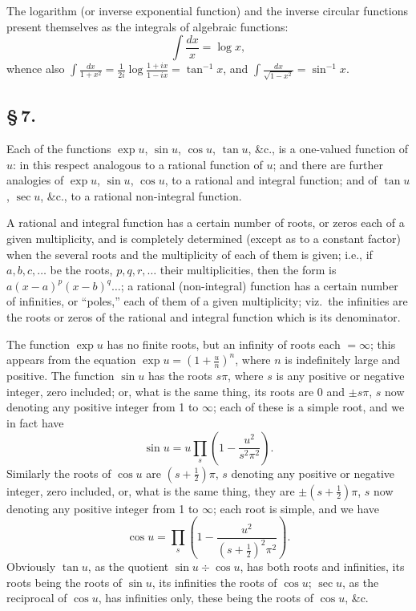 \documentclass[11pt,a4paper]{book}
\begin{document}
The logarithm (or inverse exponential function) and the inverse circular functions present themselves as the integrals of algebraic functions:
\[
\int\frac{dx}{x} = \log x,
\]
whence also $\displaystyle\int\frac{dx}{1 + x^{2}} = \frac{1}{2i}\log\frac{1 + ix}{1 - ix} = \tan^{-1}x$, and $\displaystyle\int\frac{dx}{\sqrt{1 - x^{2}}} = \sin^{-1}x$.

\subsection*{\S\,7.}

Each of the functions $\exp u$, $\sin u$, $\cos u$, $\tan u$, \&c., is a one-valued function of $u$: in this respect analogous to a rational function of $u$; and there are further analogies of $\exp u$, $\sin u$, $\cos u$, to a rational and integral function; and of $\tan u$, $\sec u$, \&c., to a rational non-integral function.

A rational and integral function has a certain number of roots, or zeros each of a given multiplicity, and is completely determined (except as to a constant factor) when the several roots and the multiplicity of each of them is given; i.e., if $a, b, c, \ldots$ be the roots, $p, q, r, \ldots$ their multiplicities, then the form is $a(x - a)^{p}(x - b)^{q}\ldots$; a rational (non-integral) function has a certain number of infinities, or ``poles,'' each of them of a given multiplicity; viz.\ the infinities are the roots or zeros of the rational and integral function which is its denominator.

The function $\exp u$ has no finite roots, but an infinity of roots each $= \infty$; this appears from the equation $\exp u = \left(1 + \frac{u}{n}\right)^{n}$, where $n$ is indefinitely large and positive. The function $\sin u$ has the roots $s\pi$, where $s$ is any positive or negative integer, zero included; or, what is the same thing, its roots are $0$ and $\pm s\pi$, $s$ now denoting any positive integer from 1 to $\infty$; each of these is a simple root, and we in fact have
\[
\sin u = u\prod_{s}\left(1 - \frac{u^{2}}{s^{2}\pi^{2}}\right).
\]
Similarly the roots of $\cos u$ are $(s + \frac{1}{2})\pi$, $s$ denoting any positive or negative integer, zero included, or, what is the same thing, they are $\pm(s + \frac{1}{2})\pi$, $s$ now denoting any positive integer from 1 to $\infty$; each root is simple, and we have
\[
\cos u = \prod_{s}\left(1 - \frac{u^{2}}{(s + \frac{1}{2})^{2}\pi^{2}}\right).
\]
Obviously $\tan u$, as the quotient $\sin u \div \cos u$, has both roots and infinities, its roots being the roots of $\sin u$, its infinities the roots of $\cos u$; $\sec u$, as the reciprocal of $\cos u$, has infinities only, these being the roots of $\cos u$, \&c.
\end{document}
